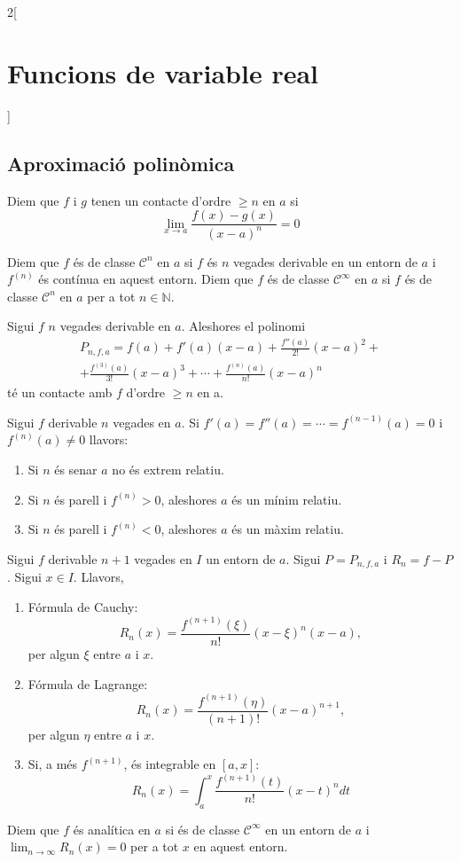 \documentclass[class=article,10pt,crop=false]{standalone}
\begin{document}
\begin{multicols}{2}[\section{Funcions de variable real}]
\subsection{Aproximació polinòmica}
\begin{definition}
Diem que $f$ i $g$ tenen un contacte d'ordre $\geq n$ en $a$ si $$\lim_{x\to a}\frac{f(x)-g(x)}{(x-a)^n}=0$$
\end{definition}
\begin{definition}
Diem que $f$ és de classe $\mathcal{C}^n$ en $a$ si $f$ és $n$ vegades derivable en un entorn de $a$ i $f^{(n)}$ és contínua en aquest entorn. Diem que $f$ és de classe $\mathcal{C}^\infty$ en $a$ si $f$ és de classe $\mathcal{C}^n$ en $a$ per a tot $n\in\mathbb{N}$.
\end{definition}
\begin{theorem}
Sigui $f$ $n$ vegades derivable en $a$. Aleshores el polinomi
\begin{multline*}
    P_{n,f,a}=f(a)+f'(a)(x-a)+\frac{f''(a)}{2!}(x-a)^2+\\+\frac{f^{(3)}(a)}{3!}(x-a)^3+\cdots+\frac{f^{(n)}(a)}{n!}(x-a)^n
\end{multline*} té un contacte amb $f$ d'ordre $\geq n$ en a.
\end{theorem}
\begin{theorem}
Sigui $f$ derivable $n$ vegades en $a$. Si $f'(a)=f''(a)=\cdots=f^{(n-1)}(a)=0$ i $f^{(n)}(a)\ne 0$ llavors:
\begin{enumerate}
    \item Si $n$ és senar $a$ no és extrem relatiu.
    \item Si $n$ és parell i $f^{(n)}>0$, aleshores $a$ és un mínim relatiu.
    \item Si $n$ és parell i $f^{(n)}<0$, aleshores $a$ és un màxim relatiu.
\end{enumerate}
\end{theorem}
\begin{theorem}
Sigui $f$ derivable $n+1$ vegades en $I$ un entorn de $a$. Sigui $P=P_{n,f,a}$ i $R_n=f-P$. Sigui $x\in I$. Llavors,
\begin{enumerate}
    \item Fórmula de Cauchy: $$R_n(x)=\frac{f^{(n+1)}(\xi)}{n!}(x-\xi)^n(x-a),$$ per algun $\xi$ entre $a$ i $x$.
    \item Fórmula de Lagrange: $$R_n(x)=\frac{f^{(n+1)}(\eta)}{(n+1)!}(x-a)^{n+1},$$ per algun $\eta$ entre $a$ i $x$.
    \item Si, a més $f^{(n+1)}$, és integrable en $[a,x]$: $$R_n(x)=\int_a^x\frac{f^{(n+1)}(t)}{n!}(x-t)^ndt$$
\end{enumerate}
\end{theorem}
\begin{definition}
Diem que $f$ és analítica en $a$ si és de classe $\mathcal{C}^\infty$ en un entorn de $a$ i $\lim_{n\to\infty}R_n(x)=0$ per a tot $x$ en aquest entorn.
\end{definition}

\end{multicols}
\end{document}
